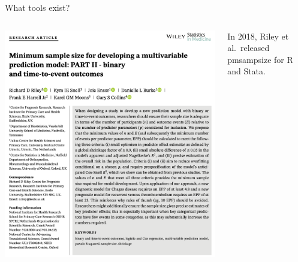 \documentclass[11pt]{beamer}
\newcommand{\bgap}{\vspace{0.8em}}
\begin{document}
\begin{frame}[t]{What tools exist?}
    \bgap

	\begin{columns}
		\begin{column}[c]{0.5\textwidth}
			\includegraphics[width=\textwidth]{figures/riley2.png}%
		\end{column}
		\begin{column}[c]{0.5\textwidth}
            In 2018, Riley et al.\ released \alert{pmsampsize} for R and Stata.
		\end{column}
	\end{columns}

\end{frame}
\end{document}

